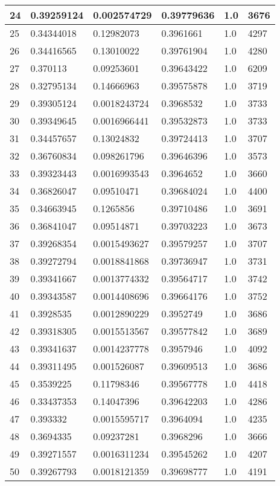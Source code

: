 \begin{longtable}{|l|l|l|l|l|l|}
24 & 0.39259124 & 0.002574729 & 0.39779636 & 1.0 & 3676 \\ \hline 
25 & 0.34344018 & 0.12982073 & 0.3961661 & 1.0 & 4297 \\ \hline 
26 & 0.34416565 & 0.13010022 & 0.39761904 & 1.0 & 4280 \\ \hline 
27 & 0.370113 & 0.09253601 & 0.39643422 & 1.0 & 6209 \\ \hline 
28 & 0.32795134 & 0.14666963 & 0.39575878 & 1.0 & 3719 \\ \hline 
29 & 0.39305124 & 0.0018243724 & 0.3968532 & 1.0 & 3733 \\ \hline 
30 & 0.39349645 & 0.0016966441 & 0.39532873 & 1.0 & 3733 \\ \hline 
31 & 0.34457657 & 0.13024832 & 0.39724413 & 1.0 & 3707 \\ \hline 
32 & 0.36760834 & 0.098261796 & 0.39646396 & 1.0 & 3573 \\ \hline 
33 & 0.39323443 & 0.0016993543 & 0.3964652 & 1.0 & 3660 \\ \hline 
34 & 0.36826047 & 0.09510471 & 0.39684024 & 1.0 & 4400 \\ \hline 
35 & 0.34663945 & 0.1265856 & 0.39710486 & 1.0 & 3691 \\ \hline 
36 & 0.36841047 & 0.09514871 & 0.39703223 & 1.0 & 3673 \\ \hline 
37 & 0.39268354 & 0.0015493627 & 0.39579257 & 1.0 & 3707 \\ \hline 
38 & 0.39272794 & 0.0018841868 & 0.39736947 & 1.0 & 3731 \\ \hline 
39 & 0.39341667 & 0.0013774332 & 0.39564717 & 1.0 & 3742 \\ \hline 
40 & 0.39343587 & 0.0014408696 & 0.39664176 & 1.0 & 3752 \\ \hline 
41 & 0.3928535 & 0.0012890229 & 0.3952749 & 1.0 & 3686 \\ \hline 
42 & 0.39318305 & 0.0015513567 & 0.39577842 & 1.0 & 3689 \\ \hline 
43 & 0.39341637 & 0.0014237778 & 0.3957946 & 1.0 & 4092 \\ \hline 
44 & 0.39311495 & 0.001526087 & 0.39609513 & 1.0 & 3686 \\ \hline 
45 & 0.3539225 & 0.11798346 & 0.39567778 & 1.0 & 4418 \\ \hline 
46 & 0.33437353 & 0.14047396 & 0.39642203 & 1.0 & 4286 \\ \hline 
47 & 0.393332 & 0.0015595717 & 0.3964094 & 1.0 & 4235 \\ \hline 
48 & 0.3694335 & 0.09237281 & 0.3968296 & 1.0 & 3666 \\ \hline 
49 & 0.39271557 & 0.0016311234 & 0.39545262 & 1.0 & 4207 \\ \hline 
50 & 0.39267793 & 0.0018121359 & 0.39698777 & 1.0 & 4191 \\ \hline 
\end{longtable}